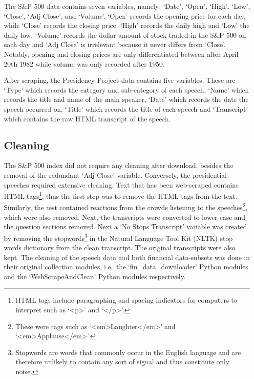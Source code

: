 \documentclass[11pt,preprint, authoryear]{elsarticle}
\numberwithin{equation}{section}
\numberwithin{figure}{section}
\numberwithin{table}{section}
\let\rmarkdownfootnote\footnote%
\def\footnote{\protect\rmarkdownfootnote}
\begin{document}
The S\&P 500 data contains seven variables, namely: `Date', `Open',
`High', `Low', `Close', `Adj Close', and `Volume'. `Open' records the
opening price for each day, while `Close' records the closing price.
`High' records the daily high and `Low' the daily low. `Volume' records
the dollar amount of stock traded in the S\&P 500 on each day and `Adj
Close' is irrelevant because it never differs from `Close'. Notably,
opening and closing prices are only differentiated between after April
20th 1982 while volume was only recorded after 1950.

After scraping, the Presidency Project data contains five variables.
These are `Type' which records the category and sub-category of each
speech, `Name' which records the title and name of the main speaker,
`Date' which records the date the speech occurred on, `Title' which
records the title of each speech and `Transcript' which contains the raw
HTML transcript of the speech.

\hypertarget{cleaning}{%
\subsection{Cleaning}\label{cleaning}}

The S\&P 500 index did not require any cleaning after download, besides
the removal of the redundant `Adj Close' variable. Conversely, the
presidential speeches required extensive cleaning. Text that has been
web-scraped contains HTML tags\footnote{HTML tags include paragraphing
  and spacing indicators for computers to interpret such as
  `\textless p\textgreater{}' and `\textless/p\textgreater{}'.}, thus
the first step was to remove the HTML tags from the text. Similarly, the
test contained reactions from the crowds listening to the
speeches\footnote{These were tags such as
  `\textless em\textgreater Laughter\textless/em\textgreater{}' and
  `\textless em\textgreater Applause\textless/em\textgreater{}'.}, which
were also removed. Next, the transcripts were converted to lower case
and the question sections removed. Next a `No Stops Transcript' variable
was created by removing the stopwords\footnote{Stopwords are words that
  commonly occur in the English language and are therefore unlikely to
  contain any sort of signal and thus constitute only noise.} in the
Natural Language Tool Kit (NLTK) stop words dictionary from the clean
transcript. The original transcripts were also kept. The cleaning of the
speech data and both financial data-subsets was done in their original
collection modules, i.e.~the `fin\_data\_downloader' Python modules and
the `WebScrapeAndClean' Python modules respectively.
\end{document}
